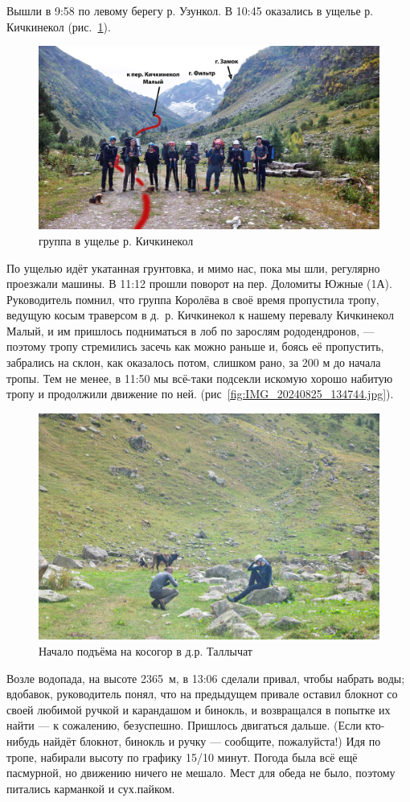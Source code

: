 Вышли в 9:58 по левому берегу р. Узункол. В 10:45 оказались в ущелье р. Кичкинекол (рис.~\ref{fig:DSC_0127.JPG}). 

\begin{figure}[h!]
	\centering
	\includegraphics[width=0.7\linewidth]{../pics/DSC_0127.jpg}
	\caption{группа в ущелье р. Кичкинекол}
	\label{fig:DSC_0127.JPG}
\end{figure}


По ущелью идёт укатанная грунтовка, и мимо нас, пока мы шли, регулярно проезжали машины. В 11:12 прошли поворот на пер. Доломиты Южные (1А). Руководитель помнил, что группа Королёва \cite{Korolyov2018} в своё время пропустила тропу, ведущую косым траверсом в д.~р. Кичкинекол к нашему перевалу Кичкинекол Малый, и им пришлось подниматься в лоб по зарослям рододендронов, --- поэтому тропу стремились засечь как можно раньше и, боясь её пропустить, забрались на склон, как оказалось потом, слишком рано, за 200 м до начала тропы. Тем не менее, в 11:50 мы всё-таки подсекли искомую хорошо набитую тропу и продолжили движение по ней. (рис~\ref{fig:IMG_20240825_134744.jpg}).  
	
	\begin{figure}[h!]
		\centering
		\includegraphics[width=0.7\linewidth]{../pics/DSC_0138.jpg}
		\caption{Начало подъёма на косогор в д.р. Таллычат}
		\label{fig:DSC_0138.JPG}
	\end{figure}
	
Возле водопада, на высоте 2365~м, в 13:06 сделали привал, чтобы набрать воды; вдобавок, руководитель понял, что на предыдущем привале оставил блокнот со своей любимой ручкой и карандашом и бинокль, и возвращался в попытке их найти --- к сожалению, безуспешно. Пришлось двигаться дальше. (Если кто-нибудь найдёт блокнот, бинокль и ручку --- сообщите, пожалуйста!) Идя по тропе, набирали высоту по графику 15/10 минут. Погода была всё ещё пасмурной, но движению ничего не мешало. Мест для обеда не было, поэтому питались карманкой и сух.пайком.

